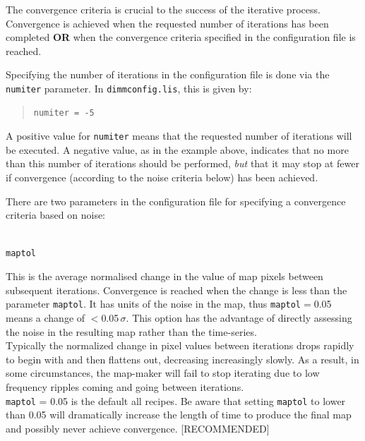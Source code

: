 \documentclass[twoside,11pt]{article}
\renewcommand{\_}{\texttt{\symbol{95}}}
\newenvironment{myquote}{\begin{quote}\begin{small}}{\end{small}\end{quote}}
\begin{document}
The convergence criteria is crucial to the success of the iterative
process. Convergence is achieved when the requested number of
iterations has been completed \textbf{OR} when the convergence
criteria specified in the configuration file is reached.

Specifying the number of iterations in the configuration file is done via
the \texttt{numiter} parameter. In \texttt{dimmconfig.lis}, this is given
by:
\vspace{-0.1cm}
\begin{myquote}
\begin{verbatim}
numiter = -5
\end{verbatim}
\end{myquote}
\vspace{-0.2cm}
A positive value for \texttt{numiter} means that the requested number
of iterations will be executed. A negative value, as in the example
above, indicates that no more than this number of iterations should be
performed, \emph{but} that it may stop at fewer if convergence
(according to the noise criteria below) has been achieved.

There are two parameters in the configuration file for specifying a
convergence criteria based on noise:
\\ \\
\begin{minipage}[t]{0.1\linewidth}
\texttt{maptol}
\end{minipage}
\begin{minipage}[t]{0.9\linewidth}
This is the average normalised change in the value of map pixels
between subsequent iterations. Convergence is reached when the change
is less than the parameter \texttt{maptol}. It has units of the noise
in the map, thus \texttt{maptol}$=$0.05 means a change of
$<$0.05\,$\sigma$. This option has the advantage of directly assessing
the noise in the resulting map rather than the time-series.
\vspace{3mm}\\
Typically the normalized change in pixel values between iterations
drops rapidly to begin with and then flattens out, decreasing
increasingly slowly. As a result, in some circumstances, the map-maker
will fail to stop iterating due to low frequency ripples coming and
going between iterations.
\vspace{3mm}\\
\texttt{maptol} = 0.05 is the default all recipes. Be aware that
setting \texttt{maptol} to lower than 0.05 will dramatically increase
the length of time to produce the final map and possibly never achieve
convergence. [RECOMMENDED]
\end{minipage}
\vspace{2mm}
\end{document}
